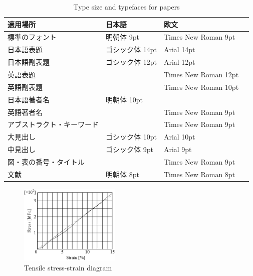\documentclass{jarticle}
\begin{document}
\begin{table}[tb]
 \caption{Type size and typefaces for papers}
 \label{tbl: table1}
 \centering
 \footnotesize
 \begin{tabular}{|p{}|l|l|l|}
  \hline
	適用場所	&日本語	&欧文 \\\hline
	標準のフォント	&明朝体 9pt	&Times New Roman 9pt \\\hline
	日本語表題	&ゴシック体 14pt	&Arial 14pt \\\hline
	日本語副表題	&ゴシック体 12pt	&Arial 12pt \\\hline
	英語表題	&&Times New Roman 12pt \\\hline
	英語副表題	&&Times New Roman 10pt \\\hline
	日本語著者名	&明朝体 10pt &\\\hline
	英語著者名	&&Times New Roman 9pt \\\hline
	アブストラクト・キーワード	&&Times New Roman 9pt \\\hline
	大見出し	&ゴシック体 10pt	&Arial 10pt \\\hline
	中見出し	&ゴシック体 9pt	&Arial 9pt \\\hline
	図・表の番号・タイトル	 &&Times New Roman 9pt \\\hline
	文献	&明朝体 8pt	&Times New Roman 8pt \\
  \hline
 \end{tabular}
\end{table}

\begin{figure}[tb]
 \centering
  \includegraphics[height=38mm]{figs/fig1.eps}
  \vspace*{-4mm}
  \caption{Tensile stress-strain diagram}
  \label{fig: fig1}
\end{figure}


\footnotesize



\normalsize
\end{document}
